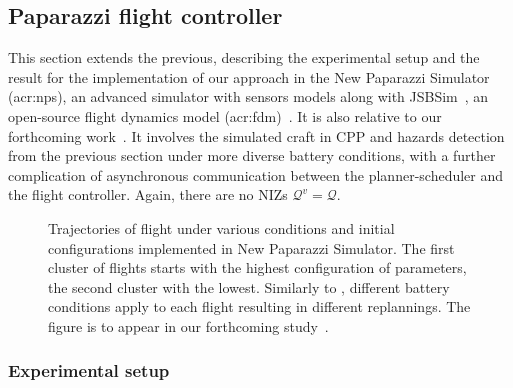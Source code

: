 \subsection{Paparazzi flight controller}
\label{sec:res-papa}

This section extends the previous, describing the experimental setup and the result for the implementation of our approach in the New Paparazzi Simulator (\Gls{acr:nps}), an advanced simulator with sensors models along with JSBSim~\citep{berndt2004jsbsim}, an open-source flight dynamics model (\Gls{acr:fdm})~\citep{papanps}. It is also relative to our forthcoming work~\citep{seewald202Xenergy}. It involves the simulated craft in CPP and hazards detection from the previous section under more diverse battery conditions, with a further complication of asynchronous communication between the planner-scheduler and the flight controller. Again, there are no NIZs $\mathcal{Q}^v=\mathcal{Q}$.

\begin{figure}[p!]
  \centering
  \selectfont
  \footnotesize    
  
  \caption[Trajectories of flight under various conditions and initial configurations in NPS]{Trajectories of flight under various conditions and initial configurations implemented in New Paparazzi Simulator. The first cluster of flights  starts with the highest configuration of parameters, the second cluster  with the lowest. Similarly to , different battery conditions apply to each flight resulting in different replannings. The figure is to appear in our forthcoming study~\citep{seewald202Xenergy}.}
  \label{fig:trajs-pprz}
\end{figure}

\subsubsection*{Experimental setup}

